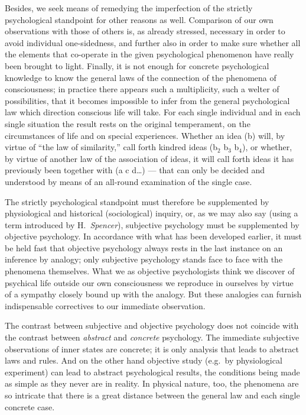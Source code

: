\documentclass[12pt,a4paper]{book}
\newcommand{\opage}[1]{\marginnote{\footnotesize\textit{[#1]}}}
\begin{document}
Besides, we seek means of remedying the imperfection of the strictly
psychological standpoint for other reasons as well. Comparison of our own
observations with those of others is, as already stressed, necessary in
order to avoid individual one-sidedness, and further also in order
\opage{29}to make sure whether all the elements that co-operate in the
given psychological phenomenon have really been brought to light.
Finally, it is not enough for concrete psychological knowledge to know
the general laws of the connection of the phenomena of consciousness; in
practice there appears such a multiplicity, such a welter of
possibilities, that it becomes impossible to infer from the general
psychological law which direction conscious life will take. For each
single individual and in each single situation the result rests on the
original temperament, on the circumstances of life and on special
experiences. Whether an idea (b) will, by virtue of ``the law of
similarity,'' call forth kindred ideas (b$_{2}$ b$_{3}$ b$_{4}$), or
whether, by virtue of another law of the association of ideas, it will
call forth ideas it has previously been together with (a c d\ldots) ---
that can only be decided and understood by means of an all-round
examination of the single case.

The strictly psychological standpoint must therefore be supplemented by
physiological and historical (sociological) inquiry, or, as we may also
say (using a term introduced by H.~\emph{Spencer}), subjective psychology
must be supplemented by objective psychology. In accordance with what has
been developed earlier, it must be held fast that objective psychology
always rests in the last instance on an inference by analogy; only
subjective psychology stands face to face with the phenomena themselves.
What we as objective psychologists think we discover of psychical life
outside our own consciousness we reproduce in ourselves by virtue of a
sympathy closely bound up with the analogy. But these analogies can
furnish indispensable correctives to our immediate observation.

The contrast between subjective and objective psychology does not
coincide with the contrast between \emph{abstract} and \emph{concrete}
psychology. The immediate subjective observations of inner states are
concrete; it is only analysis that leads to abstract laws and rules. And
on the other hand objective study (e.g.\ by physiological experiment)
can lead to abstract psychological results, the conditions being made as
simple as they never are in reality. In physical nature, too, the
phenomena are so intricate that there is a
\opage{30}great distance between the general law and each single concrete
case.
\end{document}
